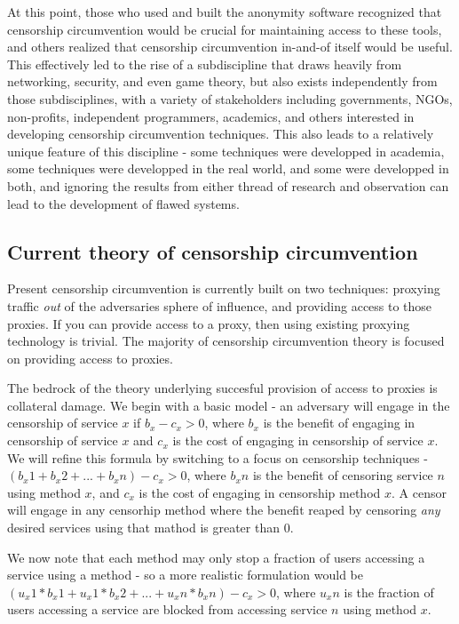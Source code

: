 \documentclass[12pt]{report}
\begin{document}
At this point, those who used and built the anonymity software recognized that censorship circumvention would be crucial for maintaining access to these tools, and others realized that censorship circumvention in-and-of itself would be useful. This effectively led to the rise of a subdiscipline that draws heavily from networking, security, and even game theory, but also exists independently from those subdisciplines, with a variety of stakeholders including governments, NGOs, non-profits, independent programmers, academics, and others interested in developing censorship circumvention techniques. This also leads to a relatively unique feature of this discipline - some techniques were developped in academia, some techniques were developped in the real world, and some were developped in both, and ignoring the results from either thread of research and observation can lead to the development of flawed systems.

\subsection{Current theory of censorship circumvention}

Present censorship circumvention is currently built on two techniques: proxying traffic \emph{out} of the adversaries sphere of influence, and providing access to those proxies. If you can provide access to a proxy, then using existing proxying technology is trivial. The majority of censorship circumvention theory is focused on providing access to proxies.

The bedrock of the theory underlying succesful provision of access to proxies is collateral damage. We begin with a basic model - an adversary will engage in the censorship of service $x$ if $b_x - c_x > 0$, where $b_x$ is the benefit of engaging in censorship of service $x$ and $c_x$ is the cost of engaging in censorship of service $x$. We will refine this formula by switching to a focus on censorship techniques - $(b_x1 + b_x2 + ... + b_xn) - c_x > 0$, where $b_xn$ is the benefit of censoring service $n$ using method $x$, and $c_x$ is the cost of engaging in censorship method $x$. A censor will engage in any censorhip method where the benefit reaped by censoring \emph{any} desired services using that mathod is greater than 0.

We now note that each method may only stop a fraction of users accessing a service using a method - so a more realistic formulation would be $(u_x1*b_x1 + u_x1*b_x2 + ... + u_xn*b_xn) - c_x > 0$, where $u_xn$ is the fraction of users accessing a service are blocked from accessing service $n$ using method $x$.
\end{document}
